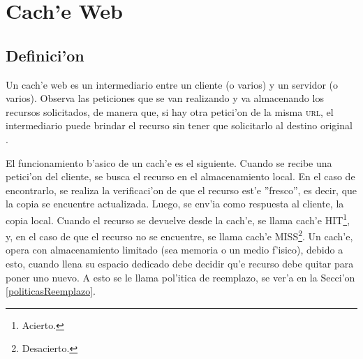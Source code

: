 \chapter{Cach'e Web}
\label{cache}
\section{Definici'on}

Un cach'e web es un intermediario entre un cliente (o varios) y un servidor (o varios). Observa las peticiones que se van realizando y va almacenando los recursos solicitados, de manera que, si hay otra petici'on de la misma \textsc{url}, el intermediario puede brindar el recurso sin tener que solicitarlo al destino original \citep{cacheDef}.

El funcionamiento b'asico de un cach'e es el siguiente. Cuando se recibe una petici'on del cliente, se busca el recurso en el almacenamiento local. En el caso de encontrarlo, se realiza la verificaci'on de que el recurso est'e ''fresco'', es decir, que la copia se encuentre actualizada. Luego, se env'ia como respuesta al cliente, la copia local. Cuando el recurso se devuelve desde la cach'e, se llama cach'e HIT\footnote{Acierto.}, y, en el caso de que el recurso no se encuentre, se llama cach'e MISS\footnote{Desacierto.}. Un cach'e, opera con almacenamiento limitado (sea memoria o un medio f'isico), debido a esto, cuando llena su espacio dedicado debe decidir qu'e recurso debe quitar para poner uno nuevo. A esto se le llama pol'itica de reemplazo, se ver'a en la Secci'on \ref{politicasReemplazo}.

\clearpage

